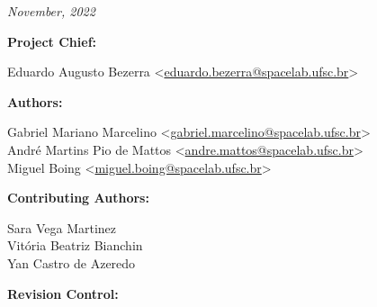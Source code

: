 %
%
%
%
%

%
%
%
%
%

\thispagestyle{empty}

\begin{center}

\textbf{\thetitle}

\textit{November, 2022}

\vspace{1cm}

\textbf{Project Chief:}

Eduardo Augusto Bezerra <\href{mailto:eduardo.bezerra@spacelab.ufsc.br}{eduardo.bezerra@spacelab.ufsc.br}>

\vspace{1cm}

\textbf{Authors:}

Gabriel Mariano Marcelino <\href{mailto:gabriel.marcelino@spacelab.ufsc.br}{gabriel.marcelino@spacelab.ufsc.br}> \\
André Martins Pio de Mattos <\href{mailto:andre.mattos@spacelab.ufsc.br}{andre.mattos@spacelab.ufsc.br}> \\
Miguel Boing <\href{mailto:miguel.boing@spacelab.ufsc.br}{miguel.boing@spacelab.ufsc.br}> \\

\vspace{1cm}

\textbf{Contributing Authors:}

Sara Vega Martinez \\
Vitória Beatriz Bianchin \\
Yan Castro de Azeredo \\

\vspace{1cm}

\textbf{Revision Control:}

\end{center}

